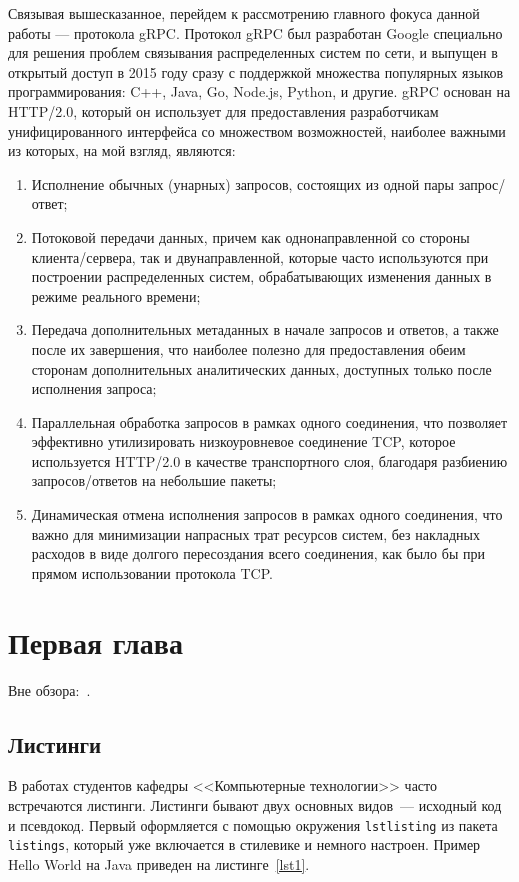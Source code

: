 \documentclass[times]{itmo-student-thesis}
\begin{document}
Связывая вышесказанное, перейдем к рассмотрению главного фокуса данной работы — протокола gRPC. Протокол gRPC был разработан Google специально для решения проблем
связывания распределенных систем по сети, и выпущен в открытый доступ в 2015 году сразу с поддержкой множества популярных языков программирования:
C++, Java, Go, Node.js, Python, и другие. gRPC основан на HTTP/2.0, который он использует для предоставления разработчикам унифицированного интерфейса со множеством возможностей,
наиболее важными из которых, на мой взгляд, являются:
\begin{enumerate}
    \item Исполнение обычных (унарных) запросов, состоящих из одной пары запрос/ответ;
    \item Потоковой передачи данных, причем как однонаправленной со стороны клиента/сервера, так и двунаправленной,
          которые часто используются при построении распределенных систем, обрабатывающих изменения данных в режиме реального времени;
    \item Передача дополнительных метаданных в начале запросов и ответов, а также после их завершения,
          что наиболее полезно для предоставления обеим сторонам дополнительных аналитических данных, доступных только после исполнения запроса;
    \item Параллельная обработка запросов в рамках одного соединения, что позволяет эффективно утилизировать низкоуровневое соединение TCP,
          которое используется HTTP/2.0 в качестве транспортного слоя, благодаря разбиению запросов/ответов на небольшие пакеты;
    \item Динамическая отмена исполнения запросов в рамках одного соединения, что важно для минимизации напрасных трат ресурсов систем,
          без накладных расходов в виде долгого пересоздания всего соединения, как было бы при прямом использовании протокола TCP. 
\end{enumerate}

\chapter{Первая глава}

Вне обзора:~\cite{bellman}.

\section{Листинги}

В работах студентов кафедры <<Компьютерные технологии>> часто встречаются листинги. Листинги бывают
двух основных видов~--- исходный код и псевдокод. Первый оформляется с помощью окружения \texttt{lstlisting}
из пакета \texttt{listings}, который уже включается в стилевике и немного настроен. Пример Hello World на Java
приведен на листинге~\ref{lst1}.
\end{document}
